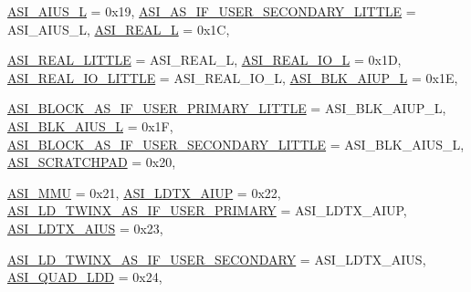 \begin{DoxyCompactItemize}
\hyperlink{namespaceSparcISA_a6dd43f1311515252b283f56d7095a1f3a94a9c7cf6474c38459703c623bba755c}{ASI\_\-AIUS\_\-L} =  0x19, 
\hyperlink{namespaceSparcISA_a6dd43f1311515252b283f56d7095a1f3ae04682d9ba1525410f5662cb8abd596e}{ASI\_\-AS\_\-IF\_\-USER\_\-SECONDARY\_\-LITTLE} =  ASI\_\-AIUS\_\-L, 
\hyperlink{namespaceSparcISA_a6dd43f1311515252b283f56d7095a1f3afca1b2aec0b9448375886600c09b46a3}{ASI\_\-REAL\_\-L} =  0x1C, 
\par
\hyperlink{namespaceSparcISA_a6dd43f1311515252b283f56d7095a1f3af3dfe20255ea687db98bd6f49f251ee3}{ASI\_\-REAL\_\-LITTLE} =  ASI\_\-REAL\_\-L, 
\hyperlink{namespaceSparcISA_a6dd43f1311515252b283f56d7095a1f3aa8cd53e6b7501463936913b4f99be9c2}{ASI\_\-REAL\_\-IO\_\-L} =  0x1D, 
\hyperlink{namespaceSparcISA_a6dd43f1311515252b283f56d7095a1f3af9e1966ffe77bbd9db1bdc1b02741552}{ASI\_\-REAL\_\-IO\_\-LITTLE} =  ASI\_\-REAL\_\-IO\_\-L, 
\hyperlink{namespaceSparcISA_a6dd43f1311515252b283f56d7095a1f3aca8f8bccb357a63a02b96aa91fa04032}{ASI\_\-BLK\_\-AIUP\_\-L} =  0x1E, 
\par
\hyperlink{namespaceSparcISA_a6dd43f1311515252b283f56d7095a1f3a39657ec7d60e1c37f59bb602ea23454e}{ASI\_\-BLOCK\_\-AS\_\-IF\_\-USER\_\-PRIMARY\_\-LITTLE} =  ASI\_\-BLK\_\-AIUP\_\-L, 
\hyperlink{namespaceSparcISA_a6dd43f1311515252b283f56d7095a1f3ab47deb5766fc9d9be340d19fe69a154a}{ASI\_\-BLK\_\-AIUS\_\-L} =  0x1F, 
\hyperlink{namespaceSparcISA_a6dd43f1311515252b283f56d7095a1f3a2c923fe0a930a58a9cb99c57afd296f7}{ASI\_\-BLOCK\_\-AS\_\-IF\_\-USER\_\-SECONDARY\_\-LITTLE} =  ASI\_\-BLK\_\-AIUS\_\-L, 
\hyperlink{namespaceSparcISA_a6dd43f1311515252b283f56d7095a1f3a25874ec8febf8f142d4c3bd62656bfa9}{ASI\_\-SCRATCHPAD} =  0x20, 
\par
\hyperlink{namespaceSparcISA_a6dd43f1311515252b283f56d7095a1f3aa3c5a664053947b87ec49c0faae2506a}{ASI\_\-MMU} =  0x21, 
\hyperlink{namespaceSparcISA_a6dd43f1311515252b283f56d7095a1f3a4bb3bab68ccaee23baa55f02e58d7beb}{ASI\_\-LDTX\_\-AIUP} =  0x22, 
\hyperlink{namespaceSparcISA_a6dd43f1311515252b283f56d7095a1f3adbd4ba5cf6efd813dadc24ebc18c212f}{ASI\_\-LD\_\-TWINX\_\-AS\_\-IF\_\-USER\_\-PRIMARY} =  ASI\_\-LDTX\_\-AIUP, 
\hyperlink{namespaceSparcISA_a6dd43f1311515252b283f56d7095a1f3aa0b7f4f35d39e83e0d94656694598dc0}{ASI\_\-LDTX\_\-AIUS} =  0x23, 
\par
\hyperlink{namespaceSparcISA_a6dd43f1311515252b283f56d7095a1f3ad84a1a5b376db736a8755068938b71d4}{ASI\_\-LD\_\-TWINX\_\-AS\_\-IF\_\-USER\_\-SECONDARY} =  ASI\_\-LDTX\_\-AIUS, 
\hyperlink{namespaceSparcISA_a6dd43f1311515252b283f56d7095a1f3a4577a5a5b497a9f9441b113d50d6479c}{ASI\_\-QUAD\_\-LDD} =  0x24, 

\end{DoxyCompactItemize}
